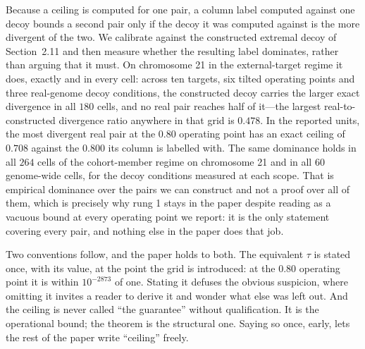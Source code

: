 Because a ceiling is computed for one pair, a column label computed against one decoy
bounds a second pair only if the decoy it was computed against is the more divergent
of the two. We calibrate against the constructed extremal decoy of Section~2.11 and
then measure whether the resulting label dominates, rather than arguing that it must.
On chromosome 21 in the external-target regime it does, exactly and in every cell:
across ten targets, six tilted operating points and three real-genome decoy
conditions, the constructed decoy carries the larger exact divergence in all $180$
cells, and no real pair reaches half of it---the largest real-to-constructed
divergence ratio anywhere in that grid is $0.478$. In the reported units, the most
divergent real pair at the $0.80$ operating point has an exact ceiling of $0.708$
against the $0.800$ its column is labelled with. The same dominance holds in all
$264$ cells of the cohort-member regime on chromosome 21 and in all $60$ genome-wide
cells, for the decoy conditions measured at each scope. That is empirical dominance
over the pairs we can construct and not a proof over all of them, which is precisely
why rung 1 stays in the paper despite reading as a vacuous bound at every operating
point we report: it is the only statement covering every pair, and nothing else in
the paper does that job.

Two conventions follow, and the paper holds to both. The equivalent $\tau$ is stated
once, with its value, at the point the grid is introduced: at the $0.80$ operating
point it is within $10^{-2873}$ of one. Stating it defuses the obvious suspicion,
where omitting it invites a reader to derive it and wonder what else was left out.
And the ceiling is never called ``the guarantee'' without qualification. It is the
operational bound; the theorem is the structural one. Saying so once, early, lets the
rest of the paper write ``ceiling'' freely.
